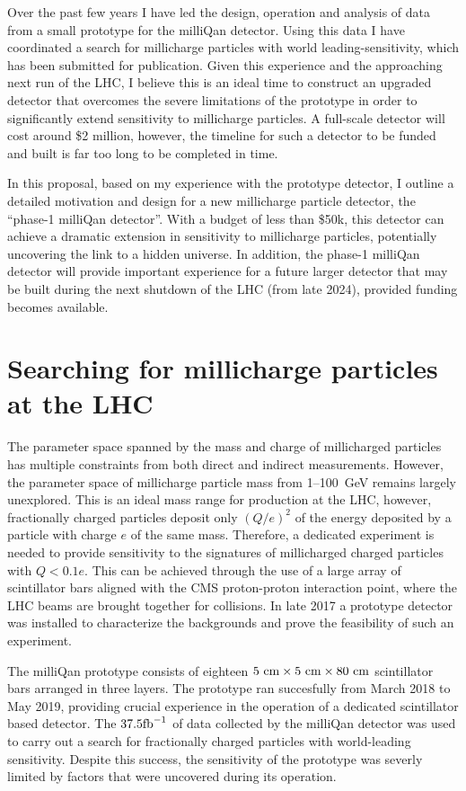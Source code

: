 \documentclass[11pt]{article}
\theoremstyle{plain} \numberwithin{equation}{section}
\theoremstyle{definition}
\begin{document}
Over the past few years I have led the design, operation and analysis
of data from a small prototype for the milliQan detector. Using this data I have coordinated
a search for millicharge particles with world leading-sensitivity, which has been submitted 
for publication. Given this experience and the approaching next run of the LHC, I believe this is an ideal 
time to construct an upgraded detector that overcomes the severe limitations of the prototype
in order to significantly extend sensitivity to millicharge particles. A full-scale 
detector will cost around \$2 million, however, the timeline for such a detector to be funded and built
is far too long to be completed in time.  

In this proposal, based on my experience with the prototype detector,
I outline a detailed motivation and design 
for a new millicharge particle detector, the ``phase-1 milliQan detector''.
With a budget of less than \$50k, this detector can 
achieve a dramatic extension in sensitivity 
to millicharge particles, potentially uncovering the link
to a hidden universe.
In addition, the phase-1 milliQan detector will provide 
important experience for a future larger detector
that may be built during the next shutdown of the LHC (from late 2024), 
provided funding becomes available.

%
\section*{Searching for millicharge particles at the LHC}
%
The parameter space spanned by the mass and charge of millicharged particles
has multiple constraints from both direct and indirect measurements.
However, the parameter space of millicharge particle mass from 1--100~GeV remains 
largely unexplored. This is an ideal mass
range for production at the LHC, however,
fractionally charged particles deposit only $(Q/e)^2$ of the energy 
deposited by a particle with charge $e$ of
the same mass. Therefore, a dedicated experiment is needed to provide sensitivity to the signatures of 
millicharged charged particles with $Q< 0.1 e$.
This can be achieved through the use of a 
large array of scintillator bars aligned with the CMS proton-proton 
interaction point, where the LHC beams are brought together for collisions. 
In late 2017 a prototype detector was installed to characterize the backgrounds and
prove the feasibility of such an experiment.

The milliQan prototype consists of eighteen $5~\rm{cm}\times5~\rm{cm}\times80~\rm{cm}$ 
scintillator bars arranged in three layers. The prototype ran succesfully from March 2018 to May 2019, providing crucial
experience in the operation of a dedicated scintillator based detector. 
The $37.5\rm{fb}^{-1}$ of data collected by the milliQan detector was used to carry out
a search for fractionally charged particles with world-leading sensitivity.
Despite this success, the sensitivity of the prototype was severly limited by
factors that were uncovered during its operation. 
\end{document}
